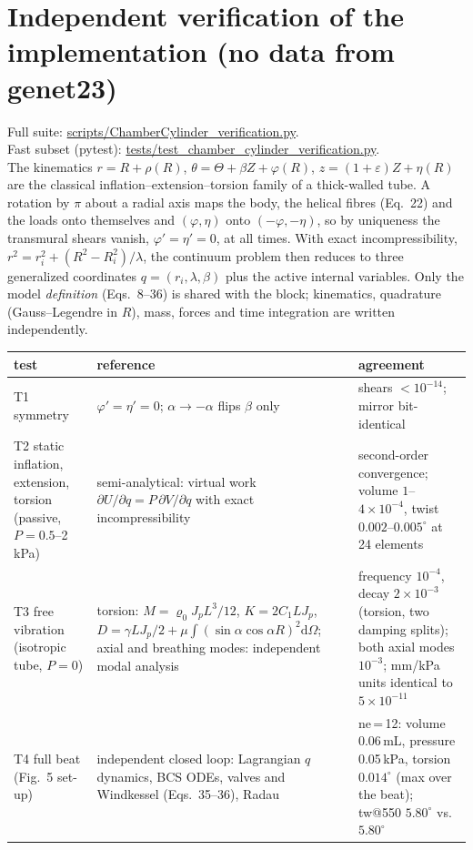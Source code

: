 \documentclass[10pt]{article}
\begin{document}
\section*{Independent verification of the implementation (no data from genet23)}
Full suite: \url{scripts/ChamberCylinder_verification.py}.\\
Fast subset (pytest): \url{tests/test_chamber_cylinder_verification.py}.\\
The kinematics $r=R+\rho(R)$,
$\theta=\Theta+\beta Z+\varphi(R)$, $z=(1+\varepsilon)Z+\eta(R)$ are the classical
inflation--extension--torsion family of a thick-walled tube. A rotation by $\pi$ about a radial
axis maps the body, the helical fibres (Eq.~22) and the loads onto themselves and $(\varphi,\eta)$
onto $(-\varphi,-\eta)$, so by uniqueness the transmural shears vanish, $\varphi'=\eta'=0$, at all
times. With exact incompressibility, $r^2=r_i^2+(R^2-R_i^2)/\lambda$, the continuum problem then
reduces to three generalized coordinates $q=(r_i,\lambda,\beta)$ plus the active internal
variables. Only the model \emph{definition} (Eqs.~8--36) is shared with the block; kinematics,
quadrature (Gauss--Legendre in $R$), mass, forces and time integration are written independently.
\begin{center}\small\begin{tabular}{P{3.2cm}P{6.0cm}P{6.0cm}}
\toprule
test & reference & agreement \\ \midrule
T1 symmetry & $\varphi'=\eta'=0$; $\alpha\to-\alpha$ flips $\beta$ only & shears $<10^{-14}$; mirror bit-identical \\
T2 static inflation, extension, torsion (passive, $P=0.5$--2\,kPa) & semi-analytical: virtual work
$\partial U/\partial q=P\,\partial V/\partial q$ with exact incompressibility & second-order
convergence; volume $1$--$4\times10^{-4}$, twist $0.002$--$0.005^\circ$ at 24 elements \\
T3 free vibration (isotropic tube, $P=0$) & torsion: $M=\varrho_0J_pL^3/12$, $K=2C_1LJ_p$,
$D=\gamma LJ_p/2+\mu\!\int(\sin\alpha\cos\alpha R)^2\mathrm d\Omega$; axial and breathing modes:
independent modal analysis & frequency $10^{-4}$, decay $2\times10^{-3}$ (torsion, two damping
splits); both axial modes $10^{-3}$; mm/kPa units identical to $5\times10^{-11}$ \\
T4 full beat (Fig.~5 set-up) & independent closed loop: Lagrangian $q$ dynamics, BCS ODEs, valves
and Windkessel (Eqs.~35--36), Radau & ne\,=\,12: volume 0.06\,mL, pressure 0.05\,kPa, torsion
$0.014^\circ$ (max over the beat); tw@550 $5.80^\circ$ vs.\ $5.80^\circ$ \\ \bottomrule
\end{tabular}\end{center}
\end{document}
